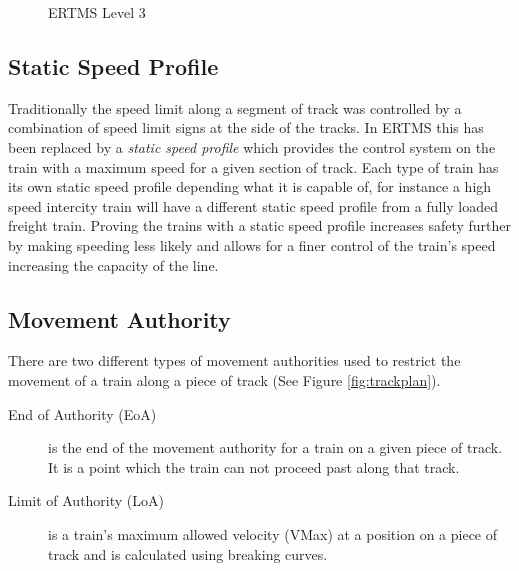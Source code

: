 \begin{center}
\begin{figure}[h!]



 \caption{ERTMS Level 3}
\label{fig:ERTMSLevel3}
\end{figure}
\end{center}


\subsection*{Static Speed Profile}
Traditionally the speed limit along a segment of track was controlled by a combination of speed limit signs at the side of the tracks. In ERTMS this has been replaced by a \emph{static speed profile} which provides the control system on the train with a maximum speed for a given section of track. Each type of train has its own static speed profile depending what it is capable of, for instance a high speed intercity train will have a different static speed profile from a fully loaded freight train. Proving the trains with a static speed profile increases safety further by making speeding less likely and allows for a finer control of the train's speed increasing the capacity of the line.

\subsection*{Movement Authority}
There are two different types of movement authorities used to restrict the movement of a train along a piece of track (See Figure \ref{fig:trackplan}).
\begin{description}

\item[End of Authority (EoA)] is the end of the movement authority for a train on a given piece of track. It is a point which the train can not proceed past along that track.

\item[Limit of Authority (LoA)]
 is a train's maximum allowed velocity (VMax) at a position on a piece of track and is calculated using breaking curves.

\end{description}

